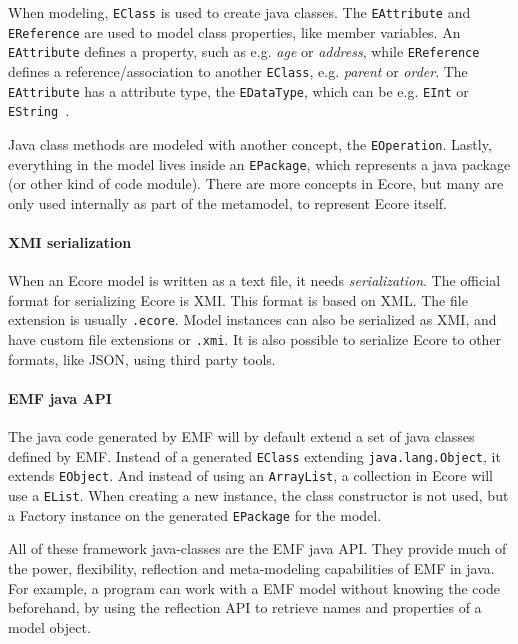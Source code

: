 When modeling, \texttt{EClass} is used to create java classes.
The \texttt{EAttribute} and \texttt{EReference} are used to model class properties, like member variables.
An \texttt{EAttribute} defines a property, such as e.g. \textit{age} or \textit{address}, while \texttt{EReference} defines a reference/association to another \texttt{EClass}, e.g. \textit{parent} or \textit{order}.
The \texttt{EAttribute} has a attribute type, the \texttt{EDataType}, which can be e.g. \texttt{EInt} or \texttt{EString}~\cite{edmerksEMFEclipseModeling2009}.

Java class methods are modeled with another concept, the \texttt{EOperation}.
Lastly, everything in the model lives inside an \texttt{EPackage}, which represents a java package (or other kind of code module).
There are more concepts in \gls{Ecore}, but many are only used internally as part of the metamodel, to represent \gls{Ecore} itself.


\paragraph{\Acrshort{XMI} serialization}
When an \gls{Ecore} model is written as a text file, it needs \textit{serialization}.
The official format for serializing Ecore is \acrfull{XMI}.
This format is based on \acrfull{XML}.
The file extension is usually \texttt{.ecore}.
Model instances can also be serialized as \acrshort{XMI}, and have custom file extensions or \texttt{.xmi}.
It is also possible to serialize \gls{Ecore} to other formats, like \gls{JSON}, using third party tools.

\paragraph{\acrshort{EMF} java \acrshort{API}}
The java code generated by \acrshort{EMF} will by default extend a set of java classes defined by \acrshort{EMF}.
Instead of a generated \texttt{EClass} extending \texttt{java.lang.Object}, it extends \texttt{EObject}.
And instead of using an \texttt{ArrayList}, a collection in \gls{Ecore} will use a \texttt{EList}.
When creating a new instance, the class constructor is not used, but a Factory instance on the generated \texttt{EPackage} for the model.


All of these framework java-classes are the \acrshort{EMF} java \gls{API}.
They provide much of the power, flexibility, reflection and meta-modeling capabilities of \acrshort{EMF} in java.
For example, a program can work with a \acrshort{EMF} model without knowing the code beforehand, by using the reflection \acrshort{API} to retrieve names and properties of a model object.


